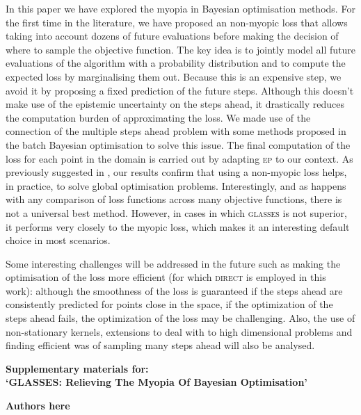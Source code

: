 \documentclass[twoside]{article}
\newcommand{\acr}[1]{\textsc{#1}\xspace}
\newcommand{\us}{\acr{glasses}}
\newcommand{\direct}{\acr{direct}}
\newcommand{\ep}{\acr{ep}}
\begin{document}
In this paper we have explored the myopia in Bayesian optimisation methods. For the first time in the literature, we have proposed an non-myopic loss that allows taking into account dozens of future evaluations before making the decision of where to sample the objective function. The key idea is to jointly model all future evaluations of the algorithm with a probability distribution and to compute the expected loss by marginalising them out. Because this is an expensive step, we avoid it by proposing a fixed prediction of the future steps. Although this doesn't make use of the epistemic uncertainty on the steps ahead, it drastically reduces the computation burden of approximating the loss. We made use of the connection of the multiple steps ahead problem with some methods proposed in the batch Bayesian optimisation to solve this issue. The final computation of the loss for each point in the domain is carried out by adapting \ep to our context. As previously suggested in \cite{osborne_gaussian_2009}, our results confirm that using a non-myopic loss helps, in practice, to solve global optimisation problems. Interestingly, and as happens with any comparison of loss functions across many objective functions, there is not a universal best method. However, in cases in which \us is not superior, it performs very closely to the myopic loss, which makes it an interesting default choice in most scenarios. 

Some interesting challenges will be addressed in the future such as making the optimisation of the loss more efficient (for which \direct is employed in this work): although the smoothness of the loss is guaranteed if the steps ahead are consistently predicted for points close in the space, if the optimization of the steps ahead fails,  the optimization of the loss may be challenging.  Also, the use of non-stationary kernels, extensions to deal with to high dimensional problems and finding efficient was of sampling many steps ahead will also be analysed.
  
\newpage
\newpage
\newpage



\newpage
\clearpage
\setcounter{section}{0}
\setcounter{equation}{0}
\renewcommand{\thesection}{S\arabic{section}}
\renewcommand{\theequation}{S.\arabic{equation}}
\onecolumn
\begin{center}
{\Large  \textbf{Supplementary materials for:\\
`GLASSES: Relieving The Myopia Of Bayesian Optimisation'}}
\end{center}
\begin{center}
\textbf{Authors here}
\end{center}
\end{document}
